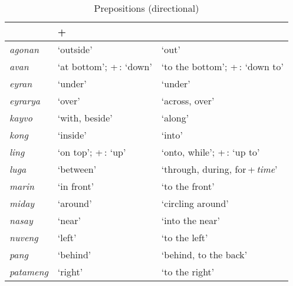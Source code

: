 \begin{table}\centering
\caption{Prepositions (directional)}
\begin{tabu} to 
\tableheaderfont\toprule
{}
	&  + \Prep{}
	\\

\toprule

agonan
	& `outside'
	& `out'
	\\

avan
	& `at bottom'; +\,\Dat{}: `down'
	& `to the bottom'; +\,\Dat{}: `down to'
	\\


eyran
	& `under'
	& `under'
	\\

eyrarya
	& `over'
	& `across, over'
	\\

kayvo
	& `with, beside'
	& `along'
	\\

kong
	& `inside'
	& `into'
	\\

ling
	& `on top'; +\,\Dat{}: `up'
	& `onto, while'; +\,\Dat{}: `up to'
	\\

luga
	& `between'
	& `through, during, for\,+\,\textit{time}'
	\\

marin
	& `in front'
	& `to the front'
	\\

miday
	& `around'
	& `circling around'
	\\

nasay
	& `near'
	& `into the near'
	\\

nuveng
	& `left'
	& `to the left'
	\\

pang
	& `behind'
	& `behind, to the back'
	\\

patameng
	& `right'
	& `to the right'
	\\

\bottomrule
\end{tabu}

\label{tab:preposdyn}
\end{table}

